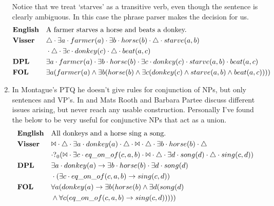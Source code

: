 \documentclass[12pt]{article}
\begin{document}
\begin{enumerate}
Notice that we treat `starves' as a transitive verb, even though the sentence is clearly ambiguous. In this case the phrase parser makes the decision for us.
\begin{align*}
&\text{\textbf{English}}&&\text{A farmer starves a horse and beats a donkey.} \\
&\text{\textbf{Visser}}&&\triangle \cdot \exists a \cdot farmer(a) \cdot  \exists b \cdot horse(b) \cdot \triangle \cdot starve(a,b)\\&&&\cdot \triangle \cdot \exists c \cdot donkey(c) \cdot \triangle \cdot beat(a,c) \\
&\text{\textbf{DPL}}&&\exists a \cdot farmer(a) \cdot \exists b \cdot horse(b) \cdot \exists c \cdot donkey(c) \cdot starve(a,b) \cdot beat(a,c) \\
&\text{\textbf{FOL}}&&\exists a(farmer(a) \wedge \exists b(horse(b) \wedge \exists c(donkey(c) \wedge starve(a,b) \wedge beat(a,c)))) \\
\end{align*}
\item
In Montague's PTQ\cite{montague1973proper} he doesn't give rules for conjunction of NPs, but only sentences and VP's. In \cite{rooth1982conjunction} and \cite{partee1983generalized} Mats Rooth and Barbara Partee discuss different issues arising, but never reach any usable construction. Personally I've found the below to be very useful for conjunctive NPs that act as a union.
\begin{align*}
&\text{\textbf{English}}&&\text{All donkeys and a horse sing a song.} \\
&\text{\textbf{Visser}}&&\Bowtie \cdot \triangle \cdot \exists a \cdot donkey(a) \cdot \triangle \cdot \Bowtie \cdot \triangle \cdot \exists b \cdot horse(b) \cdot \triangle\\&&& \cdot ?_0(\Bowtie \cdot \exists c \cdot eq\_on\_of(c,a,b) \cdot \Bowtie \cdot \triangle \cdot \exists d \cdot song(d) \cdot \triangle \cdot sing(c,d)) \\
&\text{\textbf{DPL}}&&\exists a \cdot donkey(a) \rightarrow \exists b \cdot horse(b) \cdot \exists d \cdot song(d)\\&&& \cdot (\exists c \cdot eq\_on\_of(c,a,b) \rightarrow sing(c,d)) \\
&\text{\textbf{FOL}}&&\forall a(donkey(a) \rightarrow \exists b(horse(b) \wedge \exists d(song(d)\\&&& \wedge \forall c(eq\_on\_of(c,a,b) \rightarrow sing(c,d))))) \\
\end{align*}

\end{enumerate}
\end{document}
